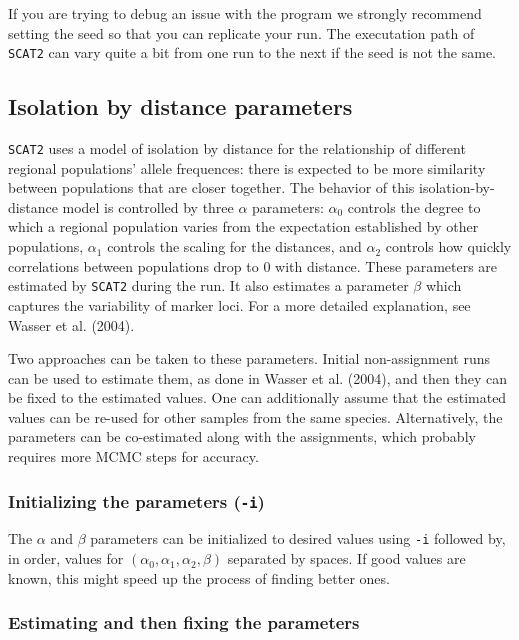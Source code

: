 \documentclass[10pt,titlepage,times,letterpaper]{article}
\def\SCAT{{\tt SCAT2} }
\begin{document}
If you are trying to debug an issue with the program we strongly
recommend setting the seed so that you can replicate your run.  The
executation path of \SCAT can vary quite a bit from one run to the
next if the seed is not the same.

\subsection{Isolation by distance parameters}

\SCAT uses a model of isolation by distance for the relationship of
different regional populations' allele frequences:  there is expected to
be more similarity between populations that are closer together.  The
behavior of this isolation-by-distance model is controlled by three
$\alpha$ parameters:  $\alpha_0$ controls the degree to which a regional
population varies from the expectation established by other populations,
$\alpha_1$ controls the scaling for the distances, and $\alpha_2$
controls how quickly correlations between populations drop to 0 with distance.
These parameters are estimated by \SCAT during the run.
It also estimates a parameter $\beta$ which captures the variability
of marker loci.  For a more detailed explanation, see Wasser et al. (2004).

Two approaches can be taken to these parameters.  Initial non-assignment
runs can be used to estimate them, as done in Wasser et al. (2004), and then
they can be fixed to the estimated values.  One can additionally assume
that the estimated values can be re-used for other samples from the same
species.  Alternatively, the parameters can be co-estimated along with
the assignments, which probably requires more MCMC steps for accuracy.

\subsubsection{Initializing the parameters ({\tt -i})}

The $\alpha$ and $\beta$ parameters can be initialized to desired values
using {\tt -i} followed by, in order, values for 
$(\alpha_0,\alpha_1,\alpha_2,\beta)$ separated by spaces.
If good values are known, this might speed up the process of finding better
ones.  

\subsubsection{Estimating and then fixing the parameters}
\end{document}
